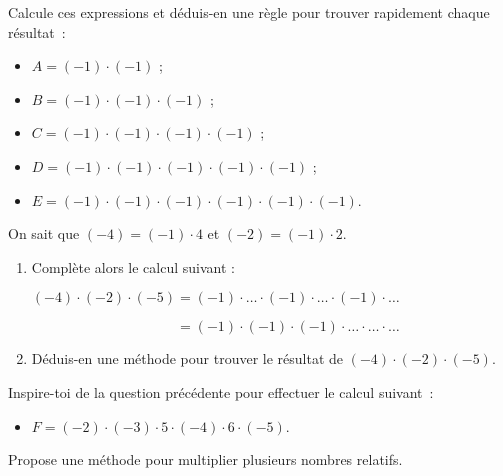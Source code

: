 
\begin{activite}

\begin{partie}
Calcule ces expressions et déduis-en une règle pour trouver rapidement chaque résultat :
\begin{itemize}
 \item $A = (- 1) \cdot (- 1)$ ;
 \item $B = (- 1) \cdot (- 1) \cdot (- 1)$ ;
 \item $C = (- 1) \cdot (- 1) \cdot (- 1) \cdot (- 1)$ ;
 \item $D = (- 1) \cdot (- 1) \cdot (- 1) \cdot (- 1) \cdot (- 1)$ ;
 \item $E = (- 1) \cdot (- 1) \cdot (- 1) \cdot (- 1) \cdot (- 1) \cdot (- 1)$.
 \end{itemize}
\end{partie}

\begin{partie}
On sait que $(- 4) = (- 1) \cdot 4$ et $(- 2) = (- 1) \cdot 2$.
\begin{enumerate}
 \item Complète alors le calcul suivant :
\begin{center} $(- 4) \cdot (- 2) \cdot (- 5) = (- 1) \cdot \ldots \cdot (- 1) \cdot \ldots \cdot (- 1) \cdot \ldots$ \end{center}
\begin{center} $\phantom{(- 4) \cdot (- 2) \cdot (- 5) }= (- 1) \cdot (- 1) \cdot (- 1) \cdot \ldots \cdot \ldots \cdot \ldots$ \end{center}
 \item Déduis-en une méthode pour trouver le résultat de $(- 4) \cdot (- 2) \cdot (- 5)$.
 \end{enumerate}
\end{partie}

\begin{partie}
Inspire-toi de la question précédente pour effectuer le calcul suivant :
\begin{itemize}
 \item $F = (- 2) \cdot (- 3) \cdot 5 \cdot (- 4) \cdot 6 \cdot (- 5)$.
 \end{itemize}
\end{partie}

\begin{partie}
Propose une méthode pour multiplier plusieurs nombres relatifs.
\end{partie}

\end{activite}


